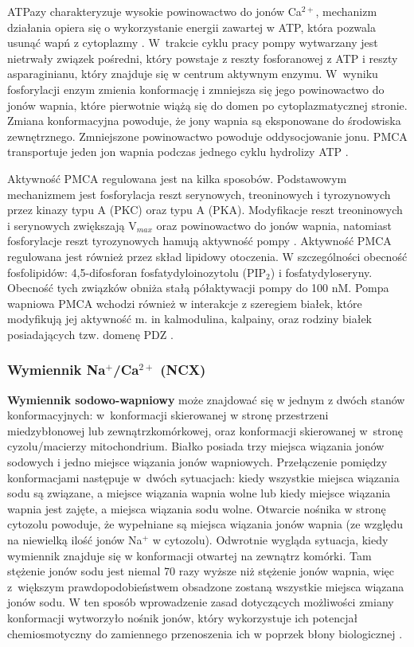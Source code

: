 ATPazy charakteryzuje wysokie powinowactwo do jonów Ca$^{2+}$, mechanizm działania opiera się o wykorzystanie energii zawartej w ATP, która pozwala usunąć wapń z cytoplazmy \cite{Brini2000}. W~trakcie cyklu pracy pompy wytwarzany jest nietrwały związek pośredni, który powstaje z reszty fosforanowej z ATP i reszty asparaginianu, który znajduje się w centrum aktywnym enzymu. W~wyniku fosforylacji enzym zmienia konformację i zmniejsza się jego powinowactwo do jonów wapnia, które pierwotnie wiążą się do domen po cytoplazmatycznej stronie. Zmiana konformacyjna powoduje, że jony wapnia są eksponowane do środowiska zewnętrznego. Zmniejszone powinowactwo powoduje oddysocjowanie jonu. PMCA transportuje jeden jon wapnia podczas jednego cyklu hydrolizy ATP \cite{DiLeva2008}.

Aktywność PMCA regulowana jest na kilka sposobów. Podstawowym mechanizmem jest fosforylacja reszt serynowych, treoninowych i tyrozynowych przez kinazy typu A (PKC) oraz typu A (PKA). Modyfikacje reszt treoninowych i serynowych zwiększają V$_{max}$ oraz powinowactwo do jonów wapnia, natomiast fosforylacje reszt tyrozynowych hamują aktywność pompy \cite{DiLeva2008}. Aktywność PMCA regulowana jest również przez skład lipidowy otoczenia. W szczególności obecność fosfolipidów: 4,5-difosforan fosfatydyloinozytolu (PIP$_2$) i fosfatydyloseryny. Obecność tych związków obniża stałą półaktywacji pompy do 100 nM. Pompa wapniowa PMCA wchodzi również w interakcje z szeregiem białek, które modyfikują jej aktywność m. in kalmodulina, kalpainy, oraz rodziny białek posiadających tzw. domenę PDZ \cite{Ranganathan1997}.

\subsubsection{Wymiennik Na$^+$/Ca$^{2+}$ (NCX)}\label{ch:NCX}
\textbf{Wymiennik sodowo-wapniowy} może znajdować się w jednym z dwóch stanów konformacyjnych: w~konformacji skierowanej w stronę przestrzeni miedzybłonowej lub zewnątrzkomórkowej, oraz konformacji skierowanej w~stronę cyzolu/macierzy mitochondrium. Białko posiada trzy miejsca wiązania jonów sodowych i jedno miejsce wiązania jonów wapniowych. Przełączenie pomiędzy konformacjami następuje w~dwóch sytuacjach: kiedy wszystkie miejsca wiązania sodu są związane, a miejsce wiązania wapnia wolne lub kiedy miejsce wiązania wapnia jest zajęte, a miejsca wiązania sodu wolne. Otwarcie nośnika w stronę cytozolu powoduje, że wypełniane są miejsca wiązania jonów wapnia (ze względu na niewielką ilość jonów Na$^+$ w cytozolu). Odwrotnie wygląda sytuacja, kiedy wymiennik znajduje się w konformacji otwartej na zewnątrz komórki. Tam stężenie jonów sodu jest niemal 70 razy wyższe niż stężenie jonów wapnia, więc z~większym prawdopodobieństwem obsadzone zostaną wszystkie miejsca wiązana jonów sodu. W ten sposób wprowadzenie zasad dotyczących możliwości zmiany konformacji wytworzyło nośnik jonów, który wykorzystuje ich potencjał chemiosmotyczny do zamiennego przenoszenia ich w poprzek błony biologicznej \cite{Altimimi2007a}.

